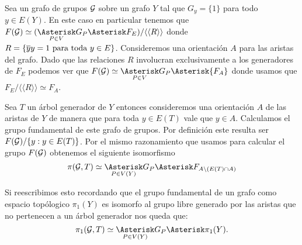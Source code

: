 \documentclass[tesis.tex]{subfiles}
\begin{document}
\begin{ej}
	Sea un grafo de grupos $\cal G$ sobre un grafo $Y$ tal que $G_y = \{ 1 \}$ para todo $y \in E(Y)$.
	En este caso en particular tenemos que 	$F(\cG) \simeq (\underset{P \in V}{\Asterisk} G_P \Asterisk F_{E}) / \langle \langle  R \rangle \rangle$
	donde $R = \{ \overline{y}y = 1 \ \text{para toda} \ y \in E \}$.
	Consideremos una orientación $A$ para las aristas del grafo.
	Dado que las relaciones $R$ involucran exclusivamente a los generadores de $F_{E}$ podemos ver que $F(\cG) \simeq \underset{P \in V}{\Asterisk} G_P \Asterisk {F_{A}}$ donde usamos que $F_{E}/\langle \langle  R \rangle \rangle \simeq F_{A}$.
	
	Sea $T$ un árbol generador de $Y$ entonces consideremos una orientación $A$ de las aristas de $Y$ de manera que para toda $y \in E(T)$ vale que $y \in A$.	
	Calculamos el grupo fundamental de este grafo de grupos.
	Por definición este resulta ser $F({\cal G}) / \{  y : y \in E(T) \}$.
	Por el mismo razonamiento que usamos para calcular el grupo $F({\cal G})$ obtenemos el siguiente isomorfismo
	\[
		\pi({\cal G}, T) \simeq \underset{P \in V(Y)}{\Asterisk} G_P \Asterisk F_{A \setminus (E(T) \cap A)}
	\]
	
	Si reescribimos esto recordando que el grupo fundamental de un grafo como espacio topólogico $\pi_1(Y)$ es isomorfo al grupo libre generado por las aristas que no pertenecen a un árbol generador nos queda que: 
	\[
		\pi_1({\cal G}, T) \simeq \underset{P \in V(Y)}{\Asterisk} G_P  \Asterisk \pi_1(Y). 
	\]
\end{ej}
\end{document}
